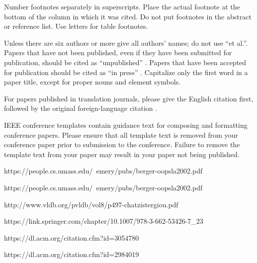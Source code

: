 \documentclass[conference]{IEEEtran}
\begin{document}
Number footnotes separately in superscripts. Place the actual footnote at 
the bottom of the column in which it was cited. Do not put footnotes in the 
abstract or reference list. Use letters for table footnotes.

Unless there are six authors or more give all authors' names; do not use 
``et al.''. Papers that have not been published, even if they have been 
submitted for publication, should be cited as ``unpublished'' \cite{b4}. Papers 
that have been accepted for publication should be cited as ``in press'' \cite{b5}. 
Capitalize only the first word in a paper title, except for proper nouns and 
element symbols.

For papers published in translation journals, please give the English 
citation first, followed by the original foreign-language citation \cite{b6}.




\vspace{12pt}
\color{red}
IEEE conference templates contain guidance text for composing and formatting conference papers. Please ensure that all template text is removed from your conference paper prior to submission to the conference. Failure to remove the template text from your paper may result in your paper not being published.

https://people.cs.umass.edu/~emery/pubs/berger-oopsla2002.pdf

https://people.cs.umass.edu/~emery/pubs/berger-oopsla2002.pdf

http://www.vldb.org/pvldb/vol8/p497-chatzistergiou.pdf

https://link.springer.com/chapter/10.1007/978-3-662-53426-7_23

https://dl.acm.org/citation.cfm?id=3054780

https://dl.acm.org/citation.cfm?id=2984019
\end{document}
